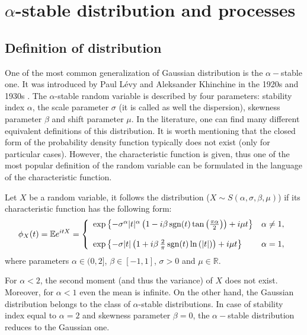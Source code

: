\chapter{$\alpha$-stable distribution and processes}\label{chapt:stable}
\section{Definition of \stab distribution}
One of the most common generalization of Gaussian distribution is the $\alpha-$stable one.  It was introduced by Paul L{\'e}vy and Aleksander Khinchine in the 1920s and 1930s \cite{levy1924theorie,khinchine1936lois}.
The $\alpha$-stable random variable is described by four parameters: stability index $\alpha$, the scale parameter $\sigma$ (it is called as well the dispersion), skewness parameter $\beta$ and shift parameter $\mu$.    
 In the literature, one can find many different equivalent definitions of this distribution. It is worth mentioning that the closed form of the probability density function typically does not exist (only for particular cases). However, the characteristic function is given, thus one of the most popular definition of the \stab random variable can be formulated in the language of the characteristic function.
\begin{definition}
\label{def6}\cite{stable}
Let $X$ be a random variable, it follows the \stab distribution ($X\sim S(\alpha,\sigma,\beta,\mu)$) if its characteristic function has the following form:
\begin{eqnarray}\label{chf_1}
\phi_X(t)=\mathbb{E}e^{itX}=\left\{
\begin{array}{ll} 
\exp\left\{-\sigma^{\alpha}|t|^{\alpha}\left(1-i\beta\operatorname{sgn}(t)\tan\left(\frac{\pi\alpha}{2}\right)\right)+i\mu t\right\} & \alpha\neq 1,\\
&\\
\exp\left\{-\sigma|t|\left(1+i\beta\,\frac{2}{\pi} \operatorname{sgn}(t)\ln\left(|t|\right)\right)+i\mu t\right\} & \alpha = 1,
\end{array}\right.
\end{eqnarray}
where parameters $\alpha \in (0,2]$, $\beta \in [-1,1]$, $\sigma>0$ and $\mu \in \mathbb{R}$. 
\end{definition}
For $\alpha<2$, the  second moment (and thus the variance) of $X$ does not exist. Moreover, for $\alpha<1$ even the mean is infinite. On the other hand, the Gaussian distribution belongs to the class of $\alpha$-stable distributions. In case of stability index equal to $\alpha=2$ and skewness parameter $\beta =0$, the $\alpha-$stable distribution reduces to the Gaussian one. 


